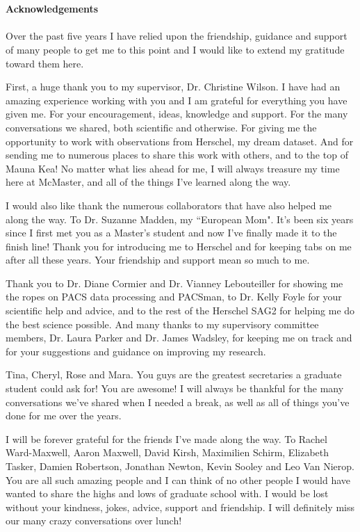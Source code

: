 \thispagestyle{fancy}

\textrm{}\\\\
\noindent\textbf{\huge\textsf{Acknowledgements}}\\\\

\noindent Over the past five years I have relied upon the friendship, guidance and support of many people to get me to this point and I would like to extend my gratitude toward them here.

First, a huge thank you to my supervisor, Dr. Christine Wilson.  I have had an amazing experience working with you and I am grateful for everything you have given me.  For your encouragement, ideas, knowledge and support.  For the many conversations we shared, both scientific and otherwise.  For giving me the opportunity to work with observations from Herschel, my dream dataset.  And for sending me to numerous places to share this work with others, and to the top of Mauna Kea!  No matter what lies ahead for me, I will always treasure my time here at McMaster, and all of the things I've learned along the way.

I would also like thank the numerous collaborators that have also helped me along the way.  To Dr. Suzanne Madden, my ``European Mom".  It's been six years since I first met you as a Master's student and now I've finally made it to the finish line!  Thank you for introducing me to Herschel and for keeping tabs on me after all these years.  Your friendship and support mean so much to me.

Thank you to Dr. Diane Cormier and Dr. Vianney Lebouteiller for showing me the ropes on PACS data processing and PACSman, to Dr. Kelly Foyle for your scientific help and advice, and to the rest of the Herschel SAG2 for helping me do the best science possible.  And many thanks to my supervisory committee members, Dr. Laura Parker and Dr. James Wadsley, for keeping me on track and for your suggestions and guidance on improving my research.

Tina, Cheryl, Rose and Mara.  You guys are the greatest secretaries a graduate student could ask for!  You are awesome!  I will always be thankful for the many conversations we've shared when I needed a break, as well as all of things you've done for me over the years.

I will be forever grateful for the friends I've made along the way.  To Rachel Ward-Maxwell, Aaron Maxwell, David Kirsh, Maximilien Schirm, Elizabeth Tasker, Damien Robertson, Jonathan Newton, Kevin Sooley and Leo Van Nierop.  You are all such amazing people and I can think of no other people I would have wanted to share the highs and lows of graduate school with.  I would be lost without your kindness, jokes, advice, support and friendship.  I will definitely miss our many crazy conversations over lunch!

